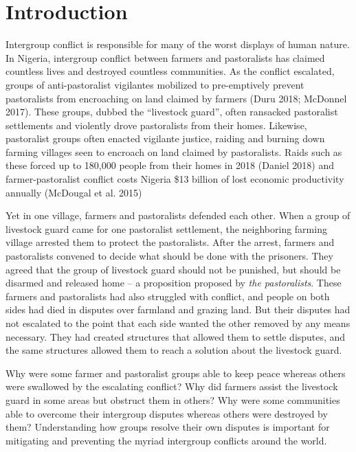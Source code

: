 \documentclass[11pt]{article}
\begin{document}
\section{Introduction}\label{introduction}

Intergroup conflict is responsible for many of the worst displays of
human nature. In Nigeria, intergroup conflict between farmers and
pastoralists has claimed countless lives and destroyed countless
communities. As the conflict escalated, groups of anti-pastoralist
vigilantes mobilized to pre-emptively prevent pastoralists from
encroaching on land claimed by farmers (Duru 2018; McDonnel 2017). These
groups, dubbed the ``livestock guard'', often ransacked pastoralist
settlements and violently drove pastoralists from their homes. Likewise,
pastoralist groups often enacted vigilante justice, raiding and burning
down farming villages seen to encroach on land claimed by pastoralists.
Raids such as these forced up to 180,000 people from their homes in 2018
(Daniel 2018) and farmer-pastoralist conflict costs Nigeria \$13 billion
of lost economic productivity annually (McDougal et al. 2015)

Yet in one village, farmers and pastoralists defended each other. When a
group of livestock guard came for one pastoralist settlement, the
neighboring farming village arrested them to protect the pastoralists.
After the arrest, farmers and pastoralists convened to decide what
should be done with the prisoners. They agreed that the group of
livestock guard should not be punished, but should be disarmed and
released home -- a proposition proposed by \emph{the pastoralists}.
These farmers and pastoralists had also struggled with conflict, and
people on both sides had died in disputes over farmland and grazing
land. But their disputes had not escalated to the point that each side
wanted the other removed by any means necessary. They had created
structures that allowed them to settle disputes, and the same structures
allowed them to reach a solution about the livestock guard.

Why were some farmer and pastoralist groups able to keep peace whereas
others were swallowed by the escalating conflict? Why did farmers assist
the livestock guard in some areas but obstruct them in others? Why were
some communities able to overcome their intergroup disputes whereas
others were destroyed by them? Understanding how groups resolve their
own disputes is important for mitigating and preventing the myriad
intergroup conflicts around the world.
\end{document}
